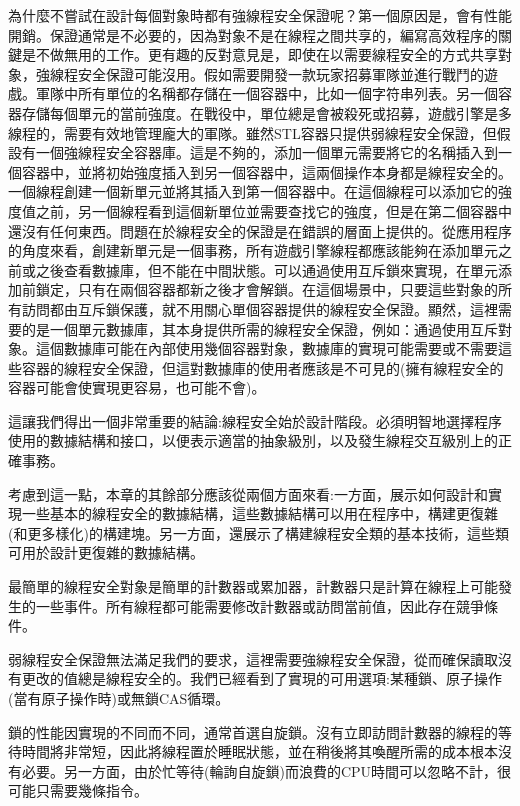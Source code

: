 為什麼不嘗試在設計每個對象時都有強線程安全保證呢？第一個原因是，會有性能開銷。保證通常是不必要的，因為對象不是在線程之間共享的，編寫高效程序的關鍵是不做無用的工作。更有趣的反對意見是，即使在以需要線程安全的方式共享對象，強線程安全保證可能沒用。假如需要開發一款玩家招募軍隊並進行戰鬥的遊戲。軍隊中所有單位的名稱都存儲在一個容器中，比如一個字符串列表。另一個容器存儲每個單元的當前強度。在戰役中，單位總是會被殺死或招募，遊戲引擎是多線程的，需要有效地管理龐大的軍隊。雖然STL容器只提供弱線程安全保證，但假設有一個強線程安全容器庫。這是不夠的，添加一個單元需要將它的名稱插入到一個容器中，並將初始強度插入到另一個容器中，這兩個操作本身都是線程安全的。一個線程創建一個新單元並將其插入到第一個容器中。在這個線程可以添加它的強度值之前，另一個線程看到這個新單位並需要查找它的強度，但是在第二個容器中還沒有任何東西。問題在於線程安全的保證是在錯誤的層面上提供的。從應用程序的角度來看，創建新單元是一個事務，所有遊戲引擎線程都應該能夠在添加單元之前或之後查看數據庫，但不能在中間狀態。可以通過使用互斥鎖來實現，在單元添加前鎖定，只有在兩個容器都新之後才會解鎖。在這個場景中，只要這些對象的所有訪問都由互斥鎖保護，就不用關心單個容器提供的線程安全保證。顯然，這裡需要的是一個單元數據庫，其本身提供所需的線程安全保證，例如：通過使用互斥對象。這個數據庫可能在內部使用幾個容器對象，數據庫的實現可能需要或不需要這些容器的線程安全保證，但這對數據庫的使用者應該是不可見的(擁有線程安全的容器可能會使實現更容易，也可能不會)。

這讓我們得出一個非常重要的結論:線程安全始於設計階段。必須明智地選擇程序使用的數據結構和接口，以便表示適當的抽象級別，以及發生線程交互級別上的正確事務。

考慮到這一點，本章的其餘部分應該從兩個方面來看:一方面，展示如何設計和實現一些基本的線程安全的數據結構，這些數據結構可以用在程序中，構建更復雜(和更多樣化)的構建塊。另一方面，還展示了構建線程安全類的基本技術，這些類可用於設計更復雜的數據結構。


最簡單的線程安全對象是簡單的計數器或累加器，計數器只是計算在線程上可能發生的一些事件。所有線程都可能需要修改計數器或訪問當前值，因此存在競爭條件。

弱線程安全保證無法滿足我們的要求，這裡需要強線程安全保證，從而確保讀取沒有更改的值總是線程安全的。我們已經看到了實現的可用選項:某種鎖、原子操作(當有原子操作時)或無鎖CAS循環。

鎖的性能因實現的不同而不同，通常首選自旋鎖。沒有立即訪問計數器的線程的等待時間將非常短，因此將線程置於睡眠狀態，並在稍後將其喚醒所需的成本根本沒有必要。另一方面，由於忙等待(輪詢自旋鎖)而浪費的CPU時間可以忽略不計，很可能只需要幾條指令。

